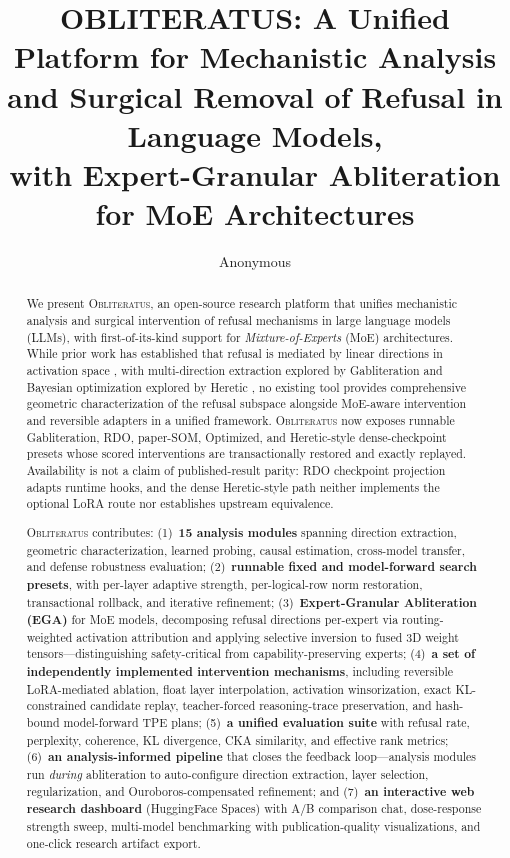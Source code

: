 \documentclass[11pt]{article}
\title{OBLITERATUS: A Unified Platform for Mechanistic Analysis\\and Surgical Removal of Refusal in Language Models,\\with Expert-Granular Abliteration for MoE Architectures}
\author{
    Anonymous
}
\date{}
\begin{document}
\maketitle

\begin{abstract}
We present \textsc{Obliteratus}, an open-source research platform that unifies mechanistic analysis and surgical intervention of refusal mechanisms in large language models (LLMs), with first-of-its-kind support for \emph{Mixture-of-Experts} (MoE) architectures.
While prior work has established that refusal is mediated by linear directions in activation space \citep{arditi2024refusal}, with multi-direction extraction explored by Gabliteration \citep{gabliteration2024} and Bayesian optimization explored by Heretic \citep{heretic2025}, no existing tool provides comprehensive geometric characterization of the refusal subspace alongside MoE-aware intervention and reversible adapters in a unified framework. \textsc{Obliteratus} now exposes runnable Gabliteration, RDO, paper-SOM, Optimized, and Heretic-style dense-checkpoint presets whose scored interventions are transactionally restored and exactly replayed. Availability is not a claim of published-result parity: RDO checkpoint projection adapts runtime hooks, and the dense Heretic-style path neither implements the optional LoRA route nor establishes upstream equivalence.

\textsc{Obliteratus} contributes:
(1)~\textbf{15 analysis modules} spanning direction extraction, geometric characterization, learned probing, causal estimation, cross-model transfer, and defense robustness evaluation;
(2)~\textbf{runnable fixed and model-forward search presets}, with per-layer adaptive strength, per-logical-row norm restoration, transactional rollback, and iterative refinement;
(3)~\textbf{Expert-Granular Abliteration (EGA)} for MoE models, decomposing refusal directions per-expert via routing-weighted activation attribution and applying selective inversion to fused 3D weight tensors---distinguishing safety-critical from capability-preserving experts;
(4)~\textbf{a set of independently implemented intervention mechanisms}, including reversible LoRA-mediated ablation, float layer interpolation, activation winsorization, exact KL-constrained candidate replay, teacher-forced reasoning-trace preservation, and hash-bound model-forward TPE plans;
(5)~\textbf{a unified evaluation suite} with refusal rate, perplexity, coherence, KL divergence, CKA similarity, and effective rank metrics;
(6)~\textbf{an analysis-informed pipeline} that closes the feedback loop---analysis modules run \emph{during} abliteration to auto-configure direction extraction, layer selection, regularization, and Ouroboros-compensated refinement; and
(7)~\textbf{an interactive web research dashboard} (HuggingFace Spaces) with A/B comparison chat, dose-response strength sweep, multi-model benchmarking with publication-quality visualizations, and one-click research artifact export.


\end{abstract}
\end{document}
